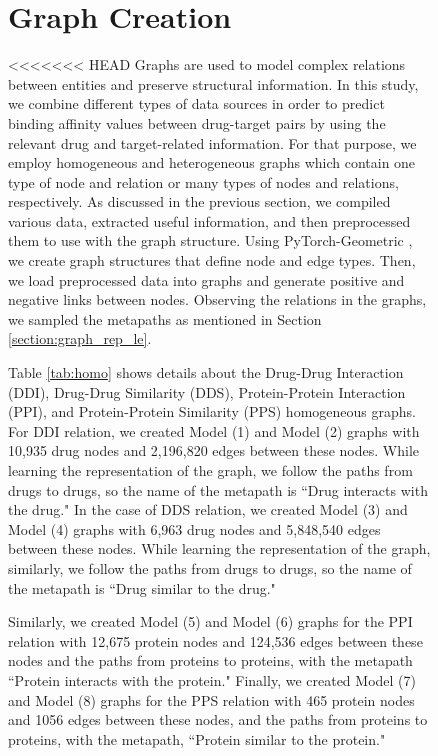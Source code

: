 \begin{figure}[h]
\section{Graph Creation}
<<<<<<< HEAD
\label{section:graph_generation}
Graphs are used to model complex relations between entities and preserve structural information. In this study, we combine different types of data sources in order to predict binding affinity values between drug-target pairs by using the relevant drug and target-related information. For that purpose, we employ homogeneous and heterogeneous graphs which contain one type of node and relation or many types of nodes and relations, respectively. As discussed in the previous section, we compiled various data, extracted useful information, and then preprocessed them to use with the graph structure. Using PyTorch-Geometric \cite{fey2019fast}, we create graph structures that define node and edge types. Then, we load preprocessed data into graphs and generate positive and negative links between nodes. Observing the relations in the graphs, we sampled the metapaths as mentioned in Section \ref{section:graph_rep_le}. 

\newpage


Table \ref{tab:homo} shows details about the Drug-Drug Interaction (DDI), Drug-Drug Similarity (DDS), Protein-Protein Interaction (PPI), and Protein-Protein Similarity (PPS) homogeneous graphs. For DDI relation, we created Model (1) and Model (2) graphs with 10,935 drug nodes and 2,196,820 edges between these nodes. While learning the representation of the graph, we follow the paths from drugs to drugs, so the name of the metapath is ``Drug interacts with the drug." In the case of DDS relation, we created Model (3) and Model (4) graphs with 6,963 drug nodes and 5,848,540 edges between these nodes. While learning the representation of the graph, similarly, we follow the paths from drugs to drugs, so the name of the metapath is ``Drug similar to the drug."


Similarly, we created Model (5) and Model (6) graphs for the PPI relation with 12,675 protein nodes and 124,536 edges between these nodes and the paths from proteins to proteins, with the metapath ``Protein interacts with the protein." Finally, we created Model (7) and Model (8) graphs for the PPS relation with 465 protein nodes and 1056 edges between these nodes, and the paths from proteins to proteins, with the metapath, ``Protein similar to the protein." 


\end{figure}
